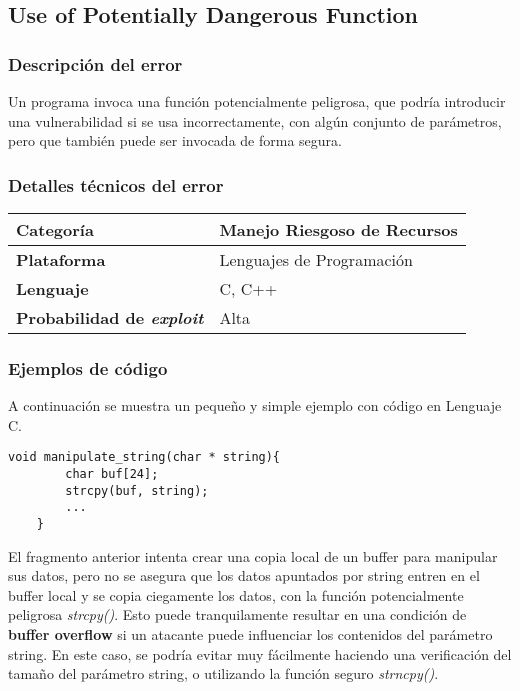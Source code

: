 \subsection{Use of Potentially Dangerous Function}

\subsubsection{Descripción del error}
Un programa invoca una función potencialmente peligrosa, que podría introducir una vulnerabilidad si se usa incorrectamente, con algún conjunto de parámetros, pero que
también puede ser invocada de forma segura.

\subsubsection{Detalles técnicos del error}
\begin{tabular}[\baselineskip]{|l|p{11cm}|}
  \hline
  \textbf{Categoría} & Manejo Riesgoso de Recursos \\
  \hline
  \textbf{Plataforma} & Lenguajes de Programación \\
  \hline
  \textbf{Lenguaje} & C, C++ \\
  \hline
  \textbf{Probabilidad de \emph{exploit}} & Alta \\
  \hline
\end{tabular} 

\subsubsection{Ejemplos de código}
A continuación se muestra un pequeño y simple ejemplo con código en Lenguaje C.

\begin{Verbatim}[frame=single]
    void manipulate_string(char * string){
        char buf[24];
        strcpy(buf, string);
        ...
    }
\end{Verbatim}

El fragmento anterior intenta crear una copia local de un buffer para manipular sus datos, pero no se asegura que los datos apuntados por string entren en el
buffer local y se copia ciegamente los datos, con la función potencialmente peligrosa \textit{strcpy()}. Esto puede tranquilamente resultar en una condición de \textbf{buffer overflow}
si un atacante puede influenciar los contenidos del parámetro string. 
En este caso, se podría evitar muy fácilmente haciendo una verificación del tamaño del parámetro string, o utilizando la función seguro \textit{strncpy()}.

